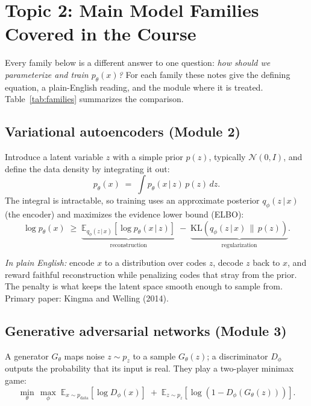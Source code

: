 \documentclass[11pt]{article}
\newcommand{\E}{\mathbb{E}}
\newcommand{\KL}{\mathrm{KL}}
\newcommand{\given}{\,\vert\,}
\theoremstyle{remark}
\begin{document}
\section{Topic 2: Main Model Families Covered in the Course}

Every family below is a different answer to one question: \emph{how should we parameterize and train $p_\theta(x)$?} For each family these notes give the defining equation, a plain-English reading, and the module where it is treated. Table~\ref{tab:families} summarizes the comparison.

\subsection{Variational autoencoders (Module 2)}

Introduce a latent variable $z$ with a simple prior $p(z)$, typically $\mathcal{N}(0, I)$, and define the data density by integrating it out:
\begin{equation}
p_\theta(x) \;=\; \int p_\theta(x \given z)\, p(z)\, dz .
\end{equation}
The integral is intractable, so training uses an approximate posterior $q_\phi(z \given x)$ (the encoder) and maximizes the evidence lower bound (ELBO):
\begin{equation}
\log p_\theta(x) \;\geq\; \underbrace{\E_{q_\phi(z \given x)}\!\left[\log p_\theta(x \given z)\right]}_{\text{reconstruction}} \;-\; \underbrace{\KL\!\left(q_\phi(z \given x)\,\|\,p(z)\right)}_{\text{regularization}} .
\end{equation}

\noindent\textit{In plain English:} encode $x$ to a distribution over codes $z$, decode $z$ back to $x$, and reward faithful reconstruction while penalizing codes that stray from the prior. The penalty is what keeps the latent space smooth enough to sample from. Primary paper: Kingma and Welling (2014).

\subsection{Generative adversarial networks (Module 3)}

A generator $G_\theta$ maps noise $z \sim p_z$ to a sample $G_\theta(z)$; a discriminator $D_\phi$ outputs the probability that its input is real. They play a two-player minimax game:
\begin{equation}
\min_{\theta}\,\max_{\phi}\; \E_{x \sim p_{\text{data}}}\!\left[\log D_\phi(x)\right] \;+\; \E_{z \sim p_z}\!\left[\log\!\left(1 - D_\phi(G_\theta(z))\right)\right].
\end{equation}
\end{document}
